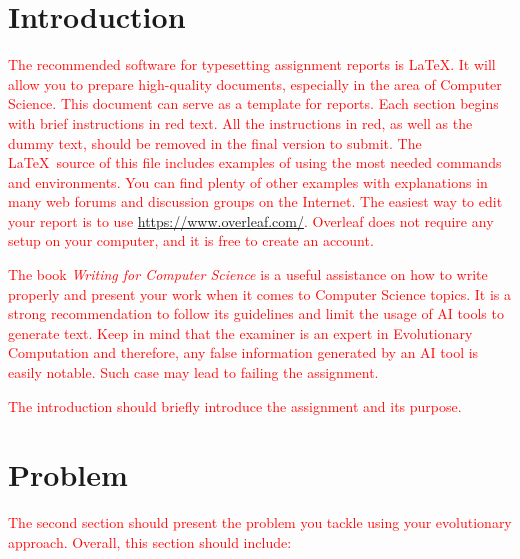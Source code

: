 \documentclass{scrartcl}
\title{\reportname}
\subtitle{An Evolutionary Algorithm for the XYZ problem}
\author{Name1\and Name2\and Name3}
\date{\today}
\begin{document}
\maketitle



\section{Introduction}
\label{sec:intro}

\textcolor{red}{The recommended software for typesetting assignment reports is \LaTeX. It will allow you to prepare high-quality documents, especially in the area of Computer Science. This document can serve as a template for reports. Each section begins with brief instructions in red text. All the instructions in red, as well as the dummy text, should be removed in the final version to submit. The \LaTeX\ source of this file includes examples of using the most needed commands and environments. You can find plenty of other examples with explanations in many web forums and discussion groups on the Internet. The easiest way to edit your report is to use \url{https://www.overleaf.com/}. Overleaf does not require any setup on your computer, and it is free to create an account.}

\textcolor{red}{The book \textit{Writing for Computer Science} \cite{zobel2014writing} is a useful assistance on how to write properly and present your work when it comes to Computer Science topics. It is a strong recommendation to follow its guidelines and limit the usage of AI tools to generate text. Keep in mind that the examiner is an expert in Evolutionary Computation and therefore, any false information generated by an AI tool is easily notable. Such case may lead to failing the assignment.}

\textcolor{red}{The introduction should briefly introduce the assignment and its purpose.}

\lipsum[4]


\section{Problem}
\label{sec:problem_description}

\textcolor{red}{The second section should present the problem you tackle using your evolutionary approach. Overall, this section should include:}
\end{document}
